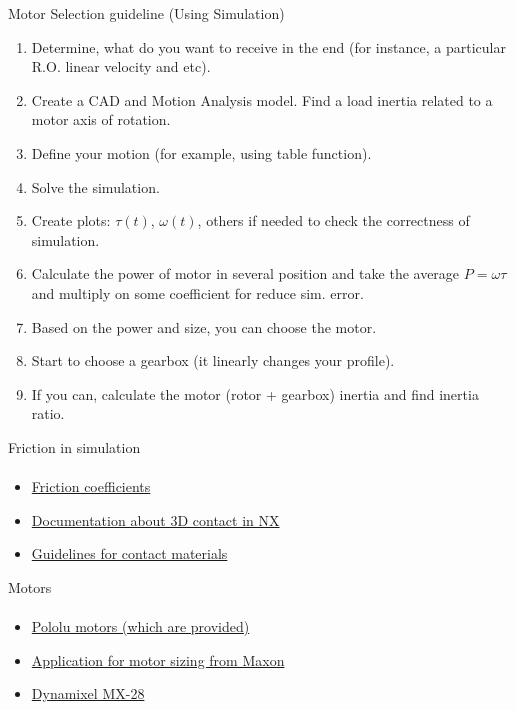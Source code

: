 \documentclass[aspectratio=169]{beamer}
\begin{document}
\begin{frame}[t]{Motor Selection guideline (Using Simulation)}
    \vspace{-0.5cm }
    \begin{enumerate}
        \small
        \item Determine, what do you want to receive in the end (for instance, a particular R.O. linear velocity and etc).
        \item Create a CAD and Motion Analysis model. Find a load inertia related to a motor axis of rotation.
        \item Define your motion (for example, using table function).
        \item Solve the simulation.
        \item Create plots: $\tau (t)$, $\omega (t)$, others if needed to check the correctness of simulation.
        \item Calculate the power of motor in several position and take the average $P = \omega \tau$ and multiply on some coefficient for reduce sim. error.
        \item Based on the power and size, you can choose the motor.
        \item Start to choose a gearbox (it linearly changes your profile).
        \item If you can, calculate the motor (rotor + gearbox) inertia and find inertia ratio.
    \end{enumerate}
\end{frame}

\begin{frame}[t]{Friction in simulation}
\framesubtitle{}
    \begin{itemize}
        \item \href{https://www.engineeringtoolbox.com/friction-coefficients-d_778.html}{Friction coefficients}
        \item \href{https://docs.sw.siemens.com/en-US/doc/289054037/PL20201105153211099.motion/id563056}{Documentation about 3D contact in NX}
        \item \href{https://docs.sw.siemens.com/en-US/doc/289054037/PL20201105153211099.motion/id562936}{Guidelines for contact materials}
    \end{itemize}
\end{frame}

\begin{frame}[t]{Motors}
\framesubtitle{}
    \begin{itemize}
        \item \href{https://www.pololu.com/product/3204}{Pololu motors (which are provided)}
        \item \href{https://www.maxongroup.net.au/maxon/view/msp}{Application for motor sizing from Maxon}
        \item \href{https://emanual.robotis.com/docs/en/dxl/mx/mx-28/}{Dynamixel MX-28}
    \end{itemize}
\end{frame}
\end{document}
